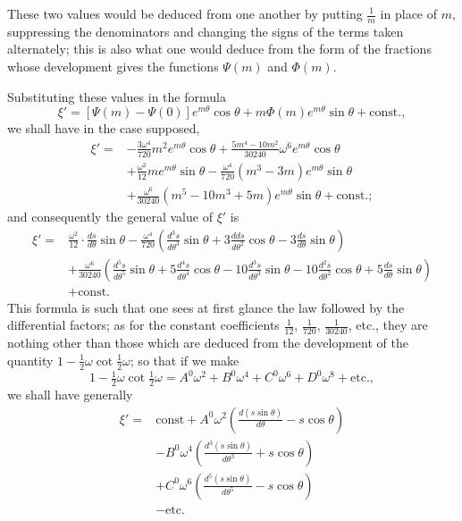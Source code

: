 \documentclass{article}
\begin{document}
These two values would be deduced from one another by putting $\frac{1}{m}$ in place of $m$, suppressing the denominators and changing the signs of the terms taken alternately; this is also what one would deduce from the form of the fractions whose development gives the functions $\Psi(m)$ and $\Phi(m)$.

Substituting these values in the formula
\[ \xi'=[\Psi(m)-\Psi(0)]e^{m\theta}\cos\theta+m\Phi(m)e^{m\theta}\sin\theta+\text{const.}, \]
we shall have in the case supposed,
\[ \begin{aligned} \xi'={}&-\frac{3\omega^{4}}{720}m^{2}e^{m\theta}\cos\theta+\frac{5m^{4}-10m^{2}}{30240}\omega^{6}e^{m\theta}\cos\theta\\ &+\frac{\omega^{2}}{12}me^{m\theta}\sin\theta-\frac{\omega^{4}}{720}(m^{3}-3m)e^{m\theta}\sin\theta\\ &+\frac{\omega^{6}}{30240}(m^{5}-10m^{3}+5m)e^{m\theta}\sin\theta+\text{const.}; \end{aligned} \]
and consequently the general value of $\xi'$ is
\[ \begin{aligned} \xi'={}&\frac{\omega^{2}}{12}\cdot\frac{ds}{d\theta}\sin\theta-\frac{\omega^{4}}{720}\left(\frac{d^{3}s}{d\theta^{3}}\sin\theta+3\frac{dds}{d\theta^{2}}\cos\theta-3\frac{ds}{d\theta}\sin\theta\right)\\ &+\frac{\omega^{6}}{30240}\left(\frac{d^{5}s}{d\theta^{5}}\sin\theta+5\frac{d^{4}s}{d\theta^{4}}\cos\theta-10\frac{d^{3}s}{d\theta^{3}}\sin\theta-10\frac{d^{2}s}{d\theta^{2}}\cos\theta+5\frac{ds}{d\theta}\sin\theta\right)\\ &+\text{const.} \end{aligned} \]
This formula is such that one sees at first glance the law followed by the differential factors; as for the constant coefficients $\frac{1}{12}$, $\frac{1}{720}$, $\frac{1}{30240}$, etc., they are nothing other than those which are deduced from the development of the quantity $1-\frac{1}{2}\omega\cot\frac{1}{2}\omega$; so that if we make
\[ 1-\tfrac{1}{2}\omega\cot\tfrac{1}{2}\omega=A^{0}\omega^{2}+B^{0}\omega^{4}+C^{0}\omega^{6}+D^{0}\omega^{8}+\text{etc.}, \]
we shall have generally
\[ \begin{aligned} \xi'={}&\text{const}+A^{0}\omega^{2}\left(\frac{d(s\sin\theta)}{d\theta}-s\cos\theta\right)\\ &-B^{0}\omega^{4}\left(\frac{d^{3}(s\sin\theta)}{d\theta^{3}}+s\cos\theta\right)\\ &+C^{0}\omega^{6}\left(\frac{d^{5}(s\sin\theta)}{d\theta^{5}}-s\cos\theta\right)\\ &-\text{etc.} \end{aligned} \]
\end{document}
